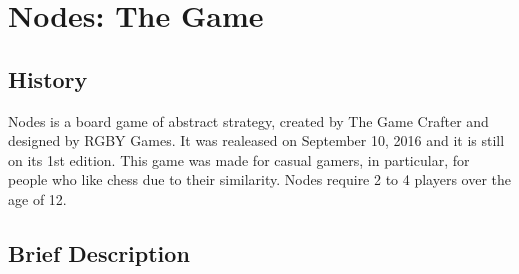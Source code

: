 \documentclass[a4paper]{article}
\begin{document}

\newpage

%
%
%
%
%
%
%


\section{Nodes: The Game}

\subsection{History}

Nodes is a board game of abstract strategy, created by The Game Crafter and designed by RGBY Games. It was realeased on September 10, 2016 and it is still on its 1st edition. This game was made for casual gamers, in particular, for people who like chess due to their similarity. Nodes require 2 to 4 players over the age of 12.


\subsection{Brief Description}
\end{document}
